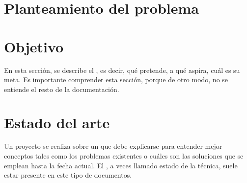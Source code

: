 

\minitoc

\section{Planteamiento del problema}

\section{Objetivo}
\label{sec:intro:obj}
En esta sección, se describe el , es decir, qué pretende, a qué aspira, cuál es su meta. Es importante comprender esta sección, porque de otro modo, no se entiende el resto de la documentación.

\section{Estado del arte}

Un proyecto se realiza sobre un  que debe explicarse para entender mejor conceptos tales como los problemas existentes o cuáles son las soluciones que se emplean hasta la fecha actual. El , a veces llamado estado de la técnica, suele estar presente en este tipo de documentos.


\chapterend
